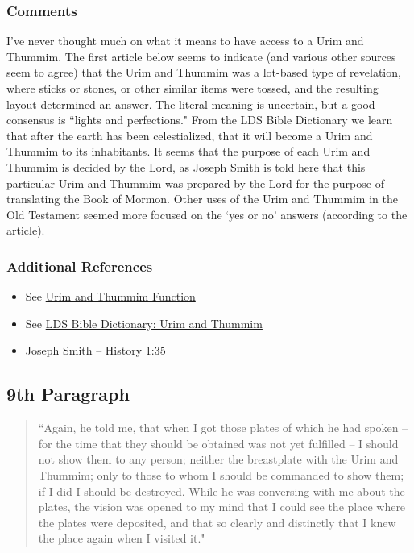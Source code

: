 \documentclass[12pt]{report}
\begin{document}
\subsubsection{Comments\label{js:comments8}}
I've never thought much on what it means to have access to a Urim and Thummim.  The first article below seems to indicate (and various other sources seem to agree) that the Urim and Thummim was a lot-based type of revelation, where sticks or stones, or other similar items were tossed, and the resulting layout determined an answer.  The literal meaning is uncertain, but a good consensus is ``lights and perfections."  From the LDS Bible Dictionary we learn that after the earth has been celestialized, that it will become a Urim and Thummim to its inhabitants.  It seems that the purpose of each Urim and Thummim is decided by the Lord, as Joseph Smith is told here that this particular Urim and Thummim was prepared by the Lord for the purpose of translating the Book of Mormon.  Other uses of the Urim and Thummim in the Old Testament seemed more focused on the `yes or no' answers (according to the article).

\subsubsection{Additional References\label{js:references8}}
\begin{itemize}
\item See \href{https://bible.org/question/how-did-urim-and-thummim-function}{Urim and Thummim Function}
\item See \href{https://www.lds.org/scriptures/bd/urim-and-thummim}{LDS Bible Dictionary: Urim and Thummim}
\item Joseph Smith -- History 1:35
\end{itemize}

\subsection{9th Paragraph\label{js:9th}}
\begin{center}
\begin{quote}
``Again, he told me, that when I got those plates of which he had spoken -- for the time that they should be obtained was not yet fulfilled -- I should not show them to any person; neither the breastplate with the Urim and Thummim; only to those to whom I should be commanded to show them; if I did I should be destroyed.  While he was conversing with me about the plates, the vision was opened to my mind that I could see the place where the plates were deposited, and that so clearly and distinctly that I knew the place again when I visited it."
\end{quote}
\end{center}
\end{document}
